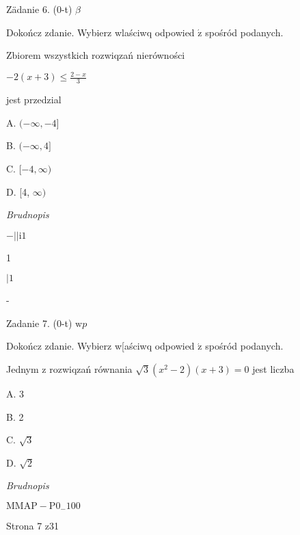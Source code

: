 \documentclass[a4paper,12pt]{article}
\begin{document}
Zädanie 6. (0-t) $\beta$

Dokończ zdanie. Wybierz wlaściwq odpowied $\acute{\mathrm{z}}$ spośród podanych.

Zbiorem wszystkich rozwiqzań nierówności

$-2(x+3)\displaystyle \leq\frac{2-x}{3}$

jest przedzial

A. $(-\infty,-4]$

B. $(-\infty,4]$

C. $[-4,\infty)$

D. [4, $\infty)$

{\it Brudnopis}

$-||\mathrm{i}1$

1

$| 1$

-

Zadanie 7. (0-t) $\mathrm{w} p$

Dokończ zdanie. Wybierz w[aściwq odpowied $\acute{\mathrm{z}}$ spośród podanych.

Jednym z rozwiqzań równania $\sqrt{3}(x^{2}-2)(x+3)=0$ jest liczba

A. 3

B. 2

C. $\sqrt{3}$

D. $\sqrt{2}$

{\it Brudnopis}

$\mathrm{M}\mathrm{M}\mathrm{A}\mathrm{P}-\mathrm{P}0_{-}100$

Strona 7 z31
\end{document}

